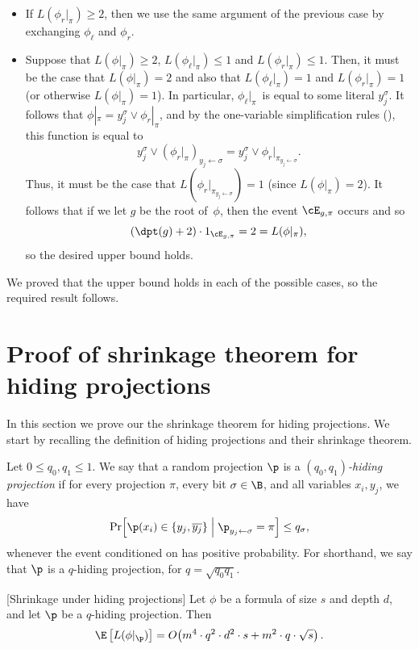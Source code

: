 \documentclass{toc}
\begin{document}
\begin{itemize}
as required. 
\item If $L(\phi_{r}|_{\pi})\ge2$, then we use the same argument of the
previous case by exchanging $\phi_{\ell}$ and $\phi_{r}$. 
\item Suppose that $L(\phi|_{\pi})\ge2$, $L(\phi_{\ell}|_{\pi})\le1$ and
$L(\phi_{r}|_{\pi})\le1$. Then, it must be the case that $L(\phi|_{\pi})=2$
and also that $L(\phi_{\ell}|_{\pi})=1$ and $L(\phi_{r}|_{\pi})=1$
(or otherwise $L(\phi|_{\pi})=1$). In particular, $\phi_{\ell}|_{\pi}$~is
equal to some literal $y_{j}^{\sigma}$. It follows that $\phi|_{\pi}=y_{j}^{\sigma}\vee\phi_{r}|_{\pi}$,
and by the one-variable simplification rules 
(),
this function is equal to 
\[
y_{j}^{\sigma}\vee\left(\phi_{r}|_{\pi}\right)_{y_{j}\gets\sigma}=y_{j}^{\sigma}\vee\phi_{r}|_{\pi_{y_{j}\gets\sigma}}.
\]
Thus, it must be the case that $L(\phi_{r}|_{\pi_{y_{j}\gets\sigma}})=1$
(since $L(\phi|_{\pi})=2$). It follows that if we let $g$ be the
root of~$\phi$, then the event $\cE_{g,\pi}$ occurs and so 
\[
(\dpt(g)+2)\cdot1_{\cE_{g,\pi}}=2=L(\phi|_{\pi}),
\]
so the desired upper bound holds. 
\end{itemize}
We proved that the upper bound holds in each of the possible cases,
so the required result follows.

\section{\label{sec:shrinkage-hiding}Proof of shrinkage theorem for hiding
projections}

In this section we prove our the shrinkage theorem for hiding projections.
We start by recalling the definition of hiding projections and their
shrinkage theorem.
\begin{repdefinition}{}
Let $0\leq q_{0},q_{1}\leq1$. We say that a random projection $\p$
is a \emph{$(q_{0},q_{1})$-hiding projection} if for every projection
$\pi$, every bit $\sigma\in\B$, and all variables $x_{i},y_{j}$,
we have 
\[
\Pr\!\left[\p(x_{i})\in\left\{ y_{j},\overline{y_{j}}\right\} \;\middle|\;\p_{y_{j}\gets\sigma}=\pi\right]\leq q_{\sigma},
\]
whenever the event conditioned on has positive probability. For shorthand,
we say that $\p$ is a $q$-hiding projection, for $q=\sqrt{q_{0}q_{1}}$. 
\end{repdefinition}

\begin{restated}{}[Shrinkage under hiding projections]
Let $\phi$ be a formula of size $s$ and depth $d$, and let $\p$
be a $q$-hiding projection. Then 
\[
\E\left[L(\phi|_{\p})\right]=O\!\left(m^{4}\cdot q^{2}\cdot d^{2}\cdot s+m^{2}\cdot q\cdot\sqrt{s}\right).
\]
\end{restated}
\end{document}
